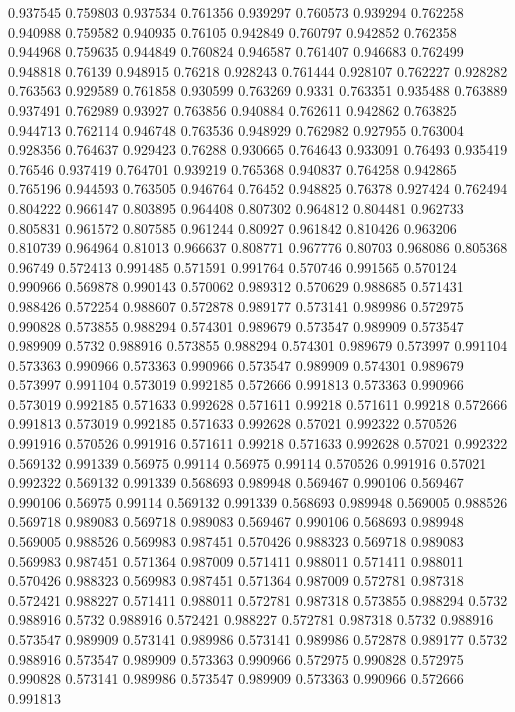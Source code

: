 0.937545 0.759803
0.937534 0.761356
0.939297 0.760573
0.939294 0.762258
0.940988 0.759582
0.940935 0.76105
0.942849 0.760797
0.942852 0.762358
0.944968 0.759635
0.944849 0.760824
0.946587 0.761407
0.946683 0.762499
0.948818 0.76139
0.948915 0.76218
0.928243 0.761444
0.928107 0.762227
0.928282 0.763563
0.929589 0.761858
0.930599 0.763269
0.9331 0.763351
0.935488 0.763889
0.937491 0.762989
0.93927 0.763856
0.940884 0.762611
0.942862 0.763825
0.944713 0.762114
0.946748 0.763536
0.948929 0.762982
0.927955 0.763004
0.928356 0.764637
0.929423 0.76288
0.930665 0.764643
0.933091 0.76493
0.935419 0.76546
0.937419 0.764701
0.939219 0.765368
0.940837 0.764258
0.942865 0.765196
0.944593 0.763505
0.946764 0.76452
0.948825 0.76378
0.927424 0.762494
0.804222 0.966147
0.803895 0.964408
0.807302 0.964812
0.804481 0.962733
0.805831 0.961572
0.807585 0.961244
0.80927 0.961842
0.810426 0.963206
0.810739 0.964964
0.81013 0.966637
0.808771 0.967776
0.80703 0.968086
0.805368 0.96749
0.572413 0.991485
0.571591 0.991764
0.570746 0.991565
0.570124 0.990966
0.569878 0.990143
0.570062 0.989312
0.570629 0.988685
0.571431 0.988426
0.572254 0.988607
0.572878 0.989177
0.573141 0.989986
0.572975 0.990828
0.573855 0.988294
0.574301 0.989679
0.573547 0.989909
0.573547 0.989909
0.5732 0.988916
0.573855 0.988294
0.574301 0.989679
0.573997 0.991104
0.573363 0.990966
0.573363 0.990966
0.573547 0.989909
0.574301 0.989679
0.573997 0.991104
0.573019 0.992185
0.572666 0.991813
0.573363 0.990966
0.573019 0.992185
0.571633 0.992628
0.571611 0.99218
0.571611 0.99218
0.572666 0.991813
0.573019 0.992185
0.571633 0.992628
0.57021 0.992322
0.570526 0.991916
0.570526 0.991916
0.571611 0.99218
0.571633 0.992628
0.57021 0.992322
0.569132 0.991339
0.56975 0.99114
0.56975 0.99114
0.570526 0.991916
0.57021 0.992322
0.569132 0.991339
0.568693 0.989948
0.569467 0.990106
0.569467 0.990106
0.56975 0.99114
0.569132 0.991339
0.568693 0.989948
0.569005 0.988526
0.569718 0.989083
0.569718 0.989083
0.569467 0.990106
0.568693 0.989948
0.569005 0.988526
0.569983 0.987451
0.570426 0.988323
0.569718 0.989083
0.569983 0.987451
0.571364 0.987009
0.571411 0.988011
0.571411 0.988011
0.570426 0.988323
0.569983 0.987451
0.571364 0.987009
0.572781 0.987318
0.572421 0.988227
0.571411 0.988011
0.572781 0.987318
0.573855 0.988294
0.5732 0.988916
0.5732 0.988916
0.572421 0.988227
0.572781 0.987318
0.5732 0.988916
0.573547 0.989909
0.573141 0.989986
0.573141 0.989986
0.572878 0.989177
0.5732 0.988916
0.573547 0.989909
0.573363 0.990966
0.572975 0.990828
0.572975 0.990828
0.573141 0.989986
0.573547 0.989909
0.573363 0.990966
0.572666 0.991813
